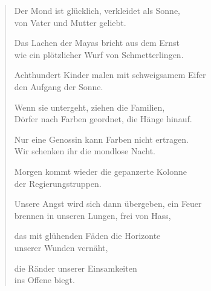 
\cleartoverso


\vspace*{-1em}
\begin{verse}

Der Mond ist glücklich, verkleidet als Sonne,\\
von Vater und Mutter geliebt.

Das Lachen der Mayas bricht aus dem Ernst\\
wie ein plötzlicher Wurf von Schmetterlingen.

Achthundert Kinder malen mit schweigsamem Eifer\\
den Aufgang der Sonne.

Wenn sie untergeht, ziehen die Familien,\\
Dörfer nach Farben geordnet, die Hänge hinauf.

Nur eine Genossin kann Farben nicht ertragen.\\
Wir schenken ihr die mondlose Nacht.

Morgen kommt wieder die gepanzerte Kolonne\\
der Regierungstruppen.

Unsere Angst wird sich dann übergeben, ein Feuer\\
brennen in unseren Lungen, frei von Hass,

das mit glühenden Fäden die Horizonte\\
unserer Wunden vernäht,

die Ränder unserer Einsamkeiten\\
ins Offene biegt.

\end{verse}

\clearpage



